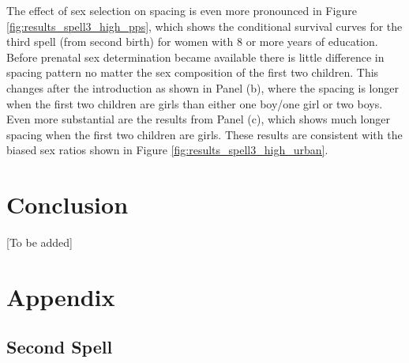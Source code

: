 \documentclass[12pt,letterpaper]{article}
\begin{document}
The effect of sex selection on spacing is even more pronounced in
Figure \ref{fig:results_spell3_high_pps}, which shows the conditional
survival curves for the third spell (from second birth) for women with
8 or more years of education.
Before prenatal sex determination became available there is little difference
in spacing pattern no matter the sex composition of the first two children.
This changes after the introduction as shown in Panel (b), where the spacing
is longer when the first two children are girls than either one boy/one girl
or two boys.
Even more substantial are the results from Panel (c), which shows much 
longer spacing when the first two children are girls.
These results are consistent with the biased sex ratios shown in 
Figure \ref{fig:results_spell3_high_urban}.



\clearpage

\section{Conclusion\label{sec:conclusion}}


[To be added]




\clearpage

\onehalfspacing






\clearpage
\newpage

\appendix
\section{Appendix}

\renewcommand\thefigure{\thesection.\arabic{figure}}    
\setcounter{figure}{0}
\renewcommand\thetable{\thesection.\arabic{table}}    
\setcounter{table}{0}
  



\clearpage

\subsection{Second Spell}
\end{document}

